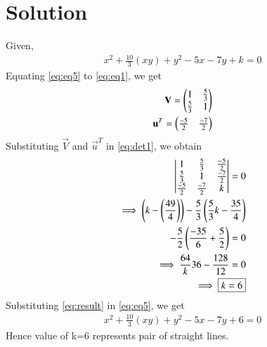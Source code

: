 \documentclass[journal,12pt,twocolumn]{IEEEtran}
\begin{document}
\section{Solution}
Given,
\begin{align}
x^{2}+ \frac{10}{3}(xy)+y^2 -5x -7y + k =0 \label{eq:eq5}
\end{align}
Equating  \eqref{eq:eq5} to \eqref{eq:eq1}, we get
\begin{align}
	\mathbf{V} = \begin{pmatrix}1& \frac{5}{3} \\ \frac{5}{3} & 1\end{pmatrix}\label{myeq}\\
	\mathbf{u}^T = \begin{pmatrix}\frac{-5}{2} & \frac{-7}{2}\end{pmatrix}\label{df}
\end{align}
Substituting $\vec{V}$ and $\vec{u}^T$ in \eqref{eq:det1}, we obtain
\begin{align}\label{dett}
\begin{vmatrix}1& \frac{5}{3} & \frac{-5}{2} \\ \frac{5}{3} & 1 & \frac{-7}{2} \\ \frac{-5}{2} & \frac{-7}{2} & k\end{vmatrix} = 0 \\
\implies \left(k - \left(\frac{49}{4}\right)\right)-\frac{5}{3}\left(\frac{5}{3}k - \frac{35}{4}\right) \nonumber\\
-
\frac{5}{2} \left(\frac{-35}{6}+\frac{5}{2}\right) = 0\\
\implies \frac{64}k{36} - \frac{128}{12} = 0\\
\implies \boxed{k = 6} \label{eq:result}
\end{align}
Substituting \eqref{eq:result} in \eqref{eq:eq5}, we get
\begin{align}
	x^{2}+ \frac{10}{3}(xy)+y^2 -5x -7y + 6 =0  \label{eq:reseq}
\end{align}
Hence value of k=6 represents pair of straight lines.
\end{document}
